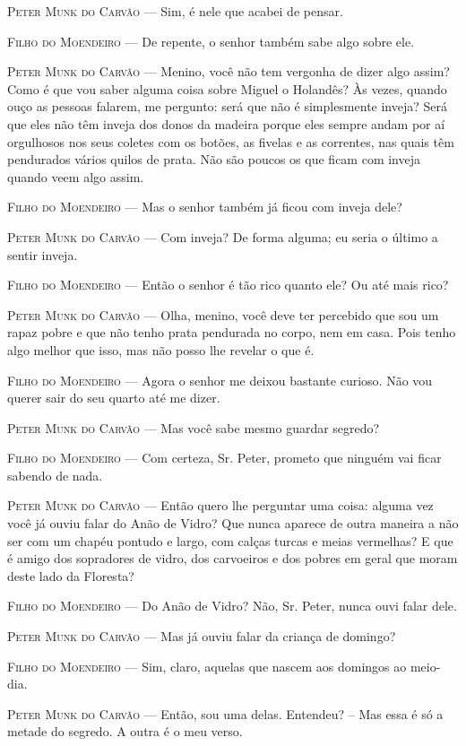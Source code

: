 \textsc{Peter Munk do Carvão} --- Sim, é nele que acabei de pensar.

\textsc{Filho do Moendeiro} --- De repente, o senhor também sabe algo sobre ele.

\textsc{Peter Munk do Carvão} --- Menino, você não tem vergonha de dizer algo
assim? Como é que vou saber alguma coisa sobre Miguel o Holandês? Às
vezes, quando ouço as pessoas falarem, me pergunto: será que não é
simplesmente inveja? Será que eles não têm inveja dos donos da madeira
porque eles sempre andam por aí orgulhosos nos seus coletes com os
botões, as fivelas e as correntes, nas quais têm pendurados vários
quilos de prata. Não são poucos os que ficam com inveja quando veem algo
assim.

\textsc{Filho do Moendeiro} --- Mas o senhor também já ficou com inveja dele?

\textsc{Peter Munk do Carvão} --- Com inveja? De forma alguma; eu seria o último a
sentir inveja.

\textsc{Filho do Moendeiro} --- Então o senhor é tão rico quanto ele? Ou até mais
rico?

\textsc{Peter Munk do Carvão} --- Olha, menino, você deve ter percebido que sou um
rapaz pobre e que não tenho prata pendurada no corpo, nem em casa. Pois
tenho algo melhor que isso, mas não posso lhe revelar o que é.

\textsc{Filho do Moendeiro} --- Agora o senhor me deixou bastante curioso. Não vou
querer sair do seu quarto até me dizer.

\textsc{Peter Munk do Carvão} --- Mas você sabe mesmo guardar segredo?

\textsc{Filho do Moendeiro} --- Com certeza, Sr. Peter, prometo que ninguém vai
ficar sabendo de nada.

\textsc{Peter Munk do Carvão} --- Então quero lhe perguntar uma coisa: alguma vez
você já ouviu falar do Anão de Vidro? Que nunca aparece de outra maneira
a não ser com um chapéu pontudo e largo, com calças turcas e meias
vermelhas? E que é amigo dos sopradores de vidro, dos carvoeiros e dos
pobres em geral que moram deste lado da Floresta?

\textsc{Filho do Moendeiro} --- Do Anão de Vidro? Não, Sr. Peter, nunca ouvi falar
dele.

\textsc{Peter Munk do Carvão} --- Mas já ouviu falar da criança de domingo?

\textsc{Filho do Moendeiro} --- Sim, claro, aquelas que nascem aos domingos ao
meio-dia.

\textsc{Peter Munk do Carvão} --- Então, sou uma delas. Entendeu? -- Mas essa é só
a metade do segredo. A outra é o meu verso.

